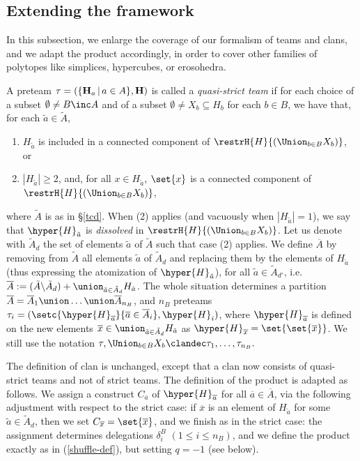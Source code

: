 \subsection{Extending the framework}\label{quasi-strict-subsection} 

In this subsection, we enlarge the coverage of our formalism of teams and clans, and we adapt the   product accordingly, in order to cover other families of polytopes like simplices, hypercubes, or erosohedra. 

A preteam $\tau=(\{{\bf H}_a\,|\,a\in A\},{\bf H})$ is called a {\it quasi-strict team} if  for each choice of a   subset $\emptyset\neq B\inc A$ and of a subset $\emptyset\neq X_b\subseteq H_b$ for each $b\in B$, we have that, for each $\tilde{a}\in \tilde{A}$,  

\begin{enumerate}
\item[(1)] $H_{\tilde{a}}$ is included  in a connected component of $\restrH{H}{(\Union_{b\in B}X_b)}$, or
\item[(2)] $|H_{\tilde{a}}|\geq 2$, and, for all  $x\in H_{\tilde{a}}$, $\set{x}$ is a connected component of  $\restrH{H}{(\Union_{b\in B}X_b)}$,
\end{enumerate}
where $\tilde{A}$ is as in \S\ref{tcd}.  When (2) applies (and vacuously when $|H_{\tilde{a}}|=1$), we say that $\hyper{H}_{\tilde{a}}$ is {\em dissolved} in $\restrH{H}{(\Union_{b\in B}X_b)}$.
Let us denote with $\tilde{A}_d$ the set of elements $\tilde{a}$ of $\tilde{A}$ such that  case (2) applies.
We  define 
$\overline{A}$ by removing from $\tilde{A}$ all elements $\tilde{a}$ of $\tilde{A}_d$ and replacing them by the elements of $H_{\tilde{a}}$ (thus expressing the atomization of $\hyper{H}_{\tilde{a}}$), for all $\tilde{a}\in \tilde{A}_{d'}$, i.e. 
$\overline{A}:=(\tilde{A}\backslash \tilde{A}_d) + \union_{\tilde{a}\in \tilde{A}_d} H_{\tilde{a}}$.
The whole situation determines a partition $\overline{A}=\overline{A}_1\union\ldots\union \overline{A}_{n_B}$, and $n_B$ preteams $\tau_i =(\setc{\hyper{H}_{\overline{a}}}{\overline{a}\in \overline{A}_i},\hyper{H}_i)$, where $\hyper{H}_{\overline{a}}$ is defined on the new elements 
$\overline{x}\in  \union_{\tilde{a}\in \tilde{A}_d} H_{\tilde{a}}$
as $\hyper{H}_{\overline{x}}=\set{\set{\overline{x}}}$.
We still use the notation 
$\displaystyle{\tau,\Union_{b\in B}X_b\clandec \tau_1,\ldots,\tau_{n_B}.}$

The definition of clan is unchanged, except that a clan now consists of quasi-strict teams and not of strict teams.
The definition of the    product  is adapted as follows. We assign a  construct $C_{\overline{a}}$ of $\hyper{H}_{\overline{a}}$ for all $\overline{a}\in \overline{A}$, via the following adjustment with respect to the strict case: if $\overline{x}$ is an element of $H_{\tilde{a}}$ for some $\tilde{a}\in \tilde{A}_d$, then we set $C_{\overline{x}}=\set{\overline{x}}$, and we finish as in the strict case: the assignment determines delegations
$\delta_i^B$  $(1\leq i\leq n_B)$, and we define the product exactly as in (\ref{shuffle-def}), but setting $q=-1$ (see below).

